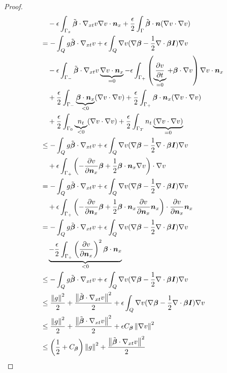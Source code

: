\documentclass{article}
\theoremstyle{definition}
\theoremstyle{remark}
\begin{document}
\begin{proof}
\begin{align*}
&\quad-\epsilon\int_{\Gamma_x}\tilde\bfbeta\cdot\Gradxt v\Grad v\cdot\bfn_x
+\frac{\epsilon}{2}\int_\Gamma\tilde\bfbeta\cdot\bfn(\Grad v\cdot\Grad v)\\
%
&=-\int_Q g\tilde\bfbeta\cdot\Gradxt v
+\epsilon\int_Q\Grad v(\Grad\bfbeta-\frac{1}{2}\Div\bfbeta\bfI)\Grad v\\
&\quad
-\epsilon\int_{\Gamma_-}\tilde\bfbeta\cdot\Gradxt v\underbrace{\Grad v\cdot\bfn_x}_{=0}
-\epsilon\int_{\Gamma_+}\LRp{\underbrace{\pd{v}{t}}_{=0}+\bfbeta\cdot\Grad v}\Grad v\cdot\bfn_x\\
&\quad
+\frac{\epsilon}{2}\int_{\Gamma_-}\underbrace{\bfbeta\cdot\bfn_x}_{<0}(\Grad v\cdot\Grad v)
+\frac{\epsilon}{2}\int_{\Gamma_+}\bfbeta\cdot\bfn_x(\Grad v\cdot\Grad v)\\
&\quad
+\frac{\epsilon}{2}\int_{\Gamma_0}\underbrace{n_t}_{<0}(\Grad v\cdot\Grad v)
+\frac{\epsilon}{2}\int_{\Gamma_T}n_t\underbrace{(\Grad v\cdot\Grad v)}_{=0}\\
%
&\leq-\int_Q g\tilde\bfbeta\cdot\Gradxt v
+\epsilon\int_Q\Grad v(\Grad\bfbeta-\frac{1}{2}\Div\bfbeta\bfI)\Grad v\\
&\quad
+\epsilon\int_{\Gamma_+}\LRp{-\pd{v}{\bfn_x}\bfbeta
+\frac{1}{2}\bfbeta\cdot\bfn_x\Grad v}\cdot\Grad v\\
%
&=-\int_Q g\tilde\bfbeta\cdot\Gradxt v
+\epsilon\int_Q\Grad v(\Grad\bfbeta-\frac{1}{2}\Div\bfbeta\bfI)\Grad v\\
&\quad
+\epsilon\int_{\Gamma_+}\LRp{-\pd{v}{\bfn_x}\bfbeta
+\frac{1}{2}\bfbeta\cdot\bfn_x\pd{v}{\bfn_x}\bfn_x}\cdot\pd{v}{\bfn_x}\bfn_x\\
%
&=-\int_Q g\tilde\bfbeta\cdot\Gradxt v
+\epsilon\int_Q\Grad v(\Grad\bfbeta-\frac{1}{2}\Div\bfbeta\bfI)\Grad v\\
&\quad
\underbrace{-\frac{\epsilon}{2}\int_{\Gamma_+}\LRp{\pd{v}{\bfn_x}}^2\bfbeta\cdot\bfn_x}_{<0}\\
%
&\leq-\int_Q g\tilde\bfbeta\cdot\Gradxt v
+\epsilon\int_Q\Grad v(\Grad\bfbeta-\frac{1}{2}\Div\bfbeta\bfI)\Grad v\\
%
&\leq\frac{\norm{g}^2}{2}+\frac{\norm{\tilde\bfbeta\cdot\Gradxt v}^2}{2}
+\epsilon\int_Q\Grad v(\Grad\bfbeta-\frac{1}{2}\Div\bfbeta\bfI)\Grad v\\
%
&\leq\frac{\norm{g}^2}{2}+\frac{\norm{\tilde\bfbeta\cdot\Gradxt v}^2}{2}
+\epsilon C_{\bfbeta}\norm{\Grad v}^2\\
%
&\leq\LRp{\frac{1}{2}+C_{\bfbeta}}\norm{g}^2+\frac{\norm{\tilde\bfbeta\cdot\Gradxt v}^2}{2}
\end{align*}
\end{proof}
\end{document}
